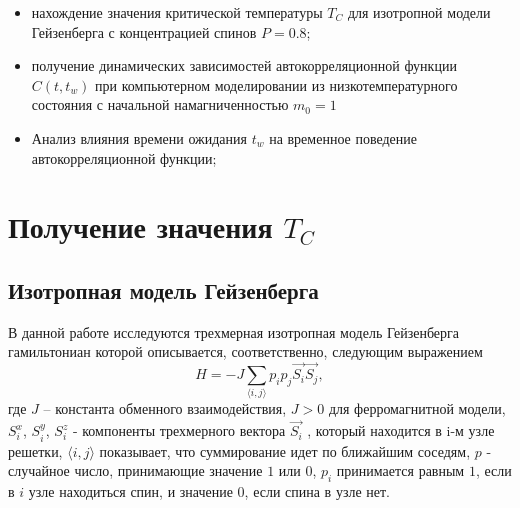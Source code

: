 \documentclass[a4paper,14pt]{extarticle}
\begin{document}
\begin{itemize}
\item нахождение значения критической температуры $T_C$ для изотропной модели Гейзенберга с концентрацией спинов $P = 0.8$;
\item получение динамических зависимостей автокорреляционной функции $C(t,t_w)$ при компьютерном моделировании из низкотемпературного состояния с начальной намагниченностью $m_0 = 1$
\item Анализ влияния времени ожидания $t_w$ на временное поведение автокорреляционной функции;
\end{itemize}


\newpage
\section{Получение значения $T_C$}

\subsection{Изотропная модель Гейзенберга}
В данной работе исследуются трехмерная изотропная модель Гейзенберга гамильтониан которой описывается, соответственно, следующим выражением
\begin{equation}
    H = -J \sum_{\langle i,j \rangle} p_ip_j\overrightarrow{S_i} \overrightarrow{S_j},
\end{equation}
где  $J$ – константа обменного взаимодействия, $J>0$ для ферромагнитной модели, $S_i^{x}$, $S_i^{y}$, $S_i^{z}$ - компоненты трехмерного вектора $\overrightarrow{S_i}$ , который находится в i-м узле решетки, $\langle i,j \rangle$ показывает, что суммирование идет по ближайшим соседям, $p$ - случайное число, принимающие значение $1$ или $0$, $p_i$ принимается равным $1$, если в $i$ узле находиться спин, и значение $0$, если спина в узле нет. 
\end{document}
